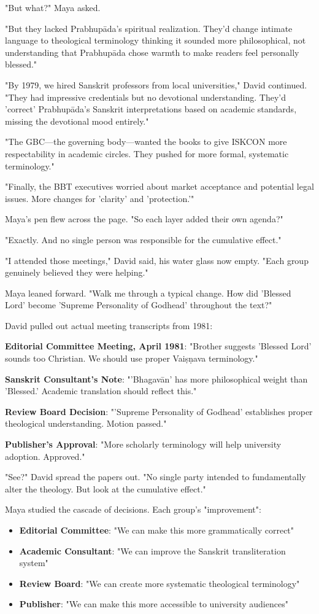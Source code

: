 \documentclass[12pt,twoside]{book}
\begin{document}
"But what?" Maya asked.

"But they lacked Prabhupāda's spiritual realization. They'd change intimate language to theological terminology thinking it sounded more philosophical, not understanding that Prabhupāda chose warmth to make readers feel personally blessed."

"By 1979, we hired Sanskrit professors from local universities," David continued. "They had impressive credentials but no devotional understanding. They'd 'correct' Prabhupāda's Sanskrit interpretations based on academic standards, missing the devotional mood entirely."

"The GBC—the governing body—wanted the books to give ISKCON more respectability in academic circles. They pushed for more formal, systematic terminology."

"Finally, the BBT executives worried about market acceptance and potential legal issues. More changes for 'clarity' and 'protection.'"

Maya's pen flew across the page. "So each layer added their own agenda?"

"Exactly. And no single person was responsible for the cumulative effect."


"I attended those meetings," David said, his water glass now empty. "Each group genuinely believed they were helping."

Maya leaned forward. "Walk me through a typical change. How did 'Blessed Lord' become 'Supreme Personality of Godhead' throughout the text?"

David pulled out actual meeting transcripts from 1981:

\textbf{\textbf{Editorial Committee Meeting, April 1981}}: "Brother suggests 'Blessed Lord' sounds too Christian. We should use proper Vaiṣṇava terminology."

\textbf{\textbf{Sanskrit Consultant's Note}}: "'Bhagavān' has more philosophical weight than 'Blessed.' Academic translation should reflect this."

\textbf{\textbf{Review Board Decision}}: "'Supreme Personality of Godhead' establishes proper theological understanding. Motion passed."

\textbf{\textbf{Publisher's Approval}}: "More scholarly terminology will help university adoption. Approved."

"See?" David spread the papers out. "No single party intended to fundamentally alter the theology. But look at the cumulative effect."

Maya studied the cascade of decisions. Each group's "improvement":
\begin{itemize}
\item \textbf{\textbf{Editorial Committee}}: "We can make this more grammatically correct"
\item \textbf{\textbf{Academic Consultant}}: "We can improve the Sanskrit transliteration system"
\item \textbf{\textbf{Review Board}}: "We can create more systematic theological terminology"
\item \textbf{\textbf{Publisher}}: "We can make this more accessible to university audiences"
\end{itemize}
\end{document}
